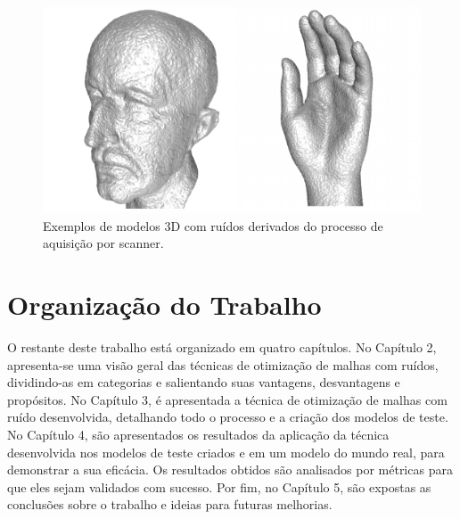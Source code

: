 \begin{figure}[!t]
\captionsetup{width=13cm}
\centering
\includegraphics[scale=0.55]{figuras/noisymodels.png}
\caption{Exemplos de modelos 3D com ruídos derivados do processo de aquisição por scanner.}
\label{fig:noisymodels}
\end{figure}

\section{Organização do Trabalho}
O restante deste trabalho está organizado em quatro capítulos. No Capítulo 2, apresenta-se uma visão geral das técnicas de otimização de malhas com ruídos, dividindo-as em categorias e salientando suas vantagens, desvantagens e propósitos. No Capítulo 3, é apresentada a técnica de otimização de malhas com ruído desenvolvida, detalhando todo o processo e a criação dos modelos de teste. No Capítulo 4, são apresentados os resultados da aplicação da técnica desenvolvida nos modelos de teste criados e em um modelo do mundo real, para demonstrar a sua eficácia. Os resultados obtidos são analisados por métricas para que eles sejam validados com sucesso. Por fim, no Capítulo 5, são expostas as conclusões sobre o trabalho e ideias para futuras melhorias.

